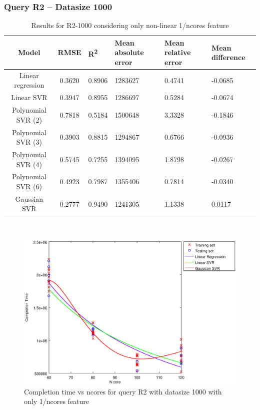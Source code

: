 \documentclass[a4paper,11pt]{article}
\begin{document}
\newpage
\subsubsection{Query R2 -- Datasize 1000}
\begin{table}[H]
	\centering
	\begin{adjustbox}{center}
		\begin{tabular}{c | c M{1.2cm} M{2.5cm} M{2.5cm} M{1.8cm}}
			Model & RMSE & R\textsuperscript{2} & Mean absolute error & Mean relative error & Mean difference \tabularnewline
			\hline
			Linear regression & 0.3620 & 0.8906 & 1283627 & 0.4741 & -0.0685 \\
			Linear SVR & 0.3947 & 0.8955 & 1286697 & 0.5284 & -0.0674 \\
			Polynomial SVR (2) & 0.7818 & 0.5184 & 1500648 & 3.3328 & -0.1846 \\
			Polynomial SVR (3) & 0.3903 & 0.8815 & 1294867 & 0.6766 & -0.0936 \\
			Polynomial SVR (4) & 0.5745 & 0.7255 & 1394095 & 1.8798 & -0.0267 \\
			Polynomial SVR (6) & 0.4923 & 0.7987 & 1355406 & 0.7814 & -0.0340 \\
			Gaussian SVR & 0.2777 & 0.9490 & 1241305 & 1.1338 & 0.0117 \\
		\end{tabular}
	\end{adjustbox}
	\\
	\caption{Results for R2-1000 considering only non-linear 1/ncores feature}
	\label{table_R2_prediction_all}
\end{table}

\begin {figure}[hbtp]
\centering
\includegraphics[width=\textwidth]{output/R2_1000_ONLY_1_OVER_NCORES/plot_R2_1000_bestmodels.eps}
\caption {Completion time vs ncores for query R2 with datasize 1000 with only 1/ncores feature}
\end {figure}
\end{document}
